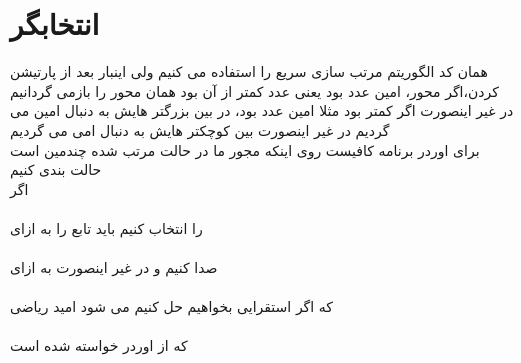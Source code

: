 \documentclass[a4paper]{article}
\begin{document}
\section*{انتخابگر}	
همان کد الگوریتم مرتب سازی سریع را استفاده می کنیم ولی اینبار بعد از پارتیشن کردن،اگر محور،
امین عدد بود یعنی 
عدد کمتر از آن بود
همان محور را بازمی گردانیم
در غیر اینصورت اگر کمتر بود
مثلا 
امین عدد بود، در بین بزرگتر هایش به دنبال
امین می گردیم
در غیر اینصورت بین کوچکتر هایش به دنبال 
امی می گردیم\\
برای اوردر برنامه کافیست روی اینکه مجور ما در حالت مرتب شده چندمین است حالت بندی کنیم\\
اگر \\
\\
 را انتخاب کنیم باید تابع را به ازای \\
\\
صدا کنیم و در غیر اینصورت به ازای\\
\\
که اگر استقرایی بخواهیم حل کنیم می شود امید ریاضی\\
\\
که از اوردر خواسته شده است
\newpage
\end{document}

